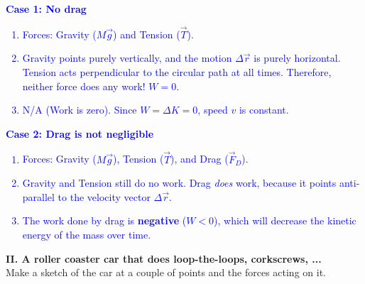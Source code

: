 \documentclass[11pt, letterpaper, openany]{book}
\newenvironment{exercise}[1][Exercise]{%
  \tcolorbox[blanker, breakable, left=1em,
    before skip=1em, after skip=1em,
    borderline west={3pt}{0pt}{PhysNavy},
    colback=PhysCream,
    before upper={\textcolor{PhysNavy}{\sffamily\bfseries #1:}\space}
  ]%
}{%
  \endtcolorbox%
}
\begin{document}
\begin{exercise}[Exercise 3]
\begin{center}
\end{center}
\textcolor{blue}{
\textbf{Case 1: No drag}
\begin{enumerate}[label=\alph*.]
    \item Forces: Gravity ($M\vec{g}$) and Tension ($\vec{T}$).
    \item Gravity points purely vertically, and the motion $\Delta\vec{r}$ is purely horizontal. Tension acts perpendicular to the circular path at all times. Therefore, neither force does any work! $W = 0$.
    \item N/A (Work is zero). Since $W = \Delta K = 0$, speed $v$ is constant.
\end{enumerate}
\textbf{Case 2: Drag is not negligible}
\begin{enumerate}[label=\alph*.]
    \item Forces: Gravity ($M\vec{g}$), Tension ($\vec{T}$), and Drag ($\vec{F}_D$).
    \item Gravity and Tension still do no work. Drag \textit{does} work, because it points anti-parallel to the velocity vector $\Delta\vec{r}$.
    \item The work done by drag is \textbf{negative} ($W < 0$), which will decrease the kinetic energy of the mass over time.
\end{enumerate}
}

\textbf{II. A roller coaster car that does loop-the-loops, corkscrews, ...} \\
Make a sketch of the car at a couple of points and the forces acting on it.
\begin{center}
\end{center}
\end{exercise}
\end{document}
